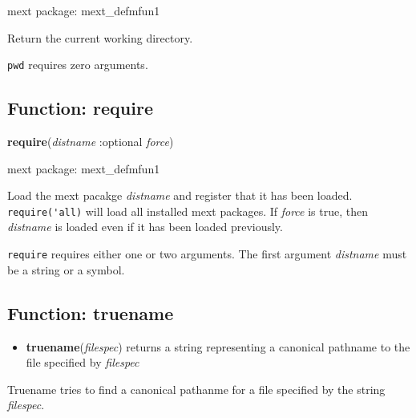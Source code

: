\documentclass[]{article}
\begin{document}
\noindent mext package: mext\_defmfun1



\vspace{5 pt}
Return the current working directory. 

\vspace{5 pt}

   {\tt pwd} requires zero arguments.


\vspace{5 pt}


\subsection{Function: require\label{sec:require}}
\hypertarget{require}{}
{\bf require}({\it distname} :optional {\it force})


\noindent mext package: mext\_defmfun1



\vspace{5 pt}
Load the mext pacakge {\it distname} and register that it has been loaded. \verb#require('all)# will load all installed mext packages. If {\it force} is true, then {\it distname} is loaded even if it has been loaded previously. 

\vspace{5 pt}

   {\tt require} requires either one or two arguments.
    The first argument {\it distname} must be a string or a symbol.


\vspace{5 pt}


\subsection{Function: truename\label{sec:truename}}
\hypertarget{truename}{}



\vspace{5 pt}
\begin{itemize}
\item[] {\bf truename}({\it filespec})
  returns a string representing a canonical pathname to the file specified by {\it filespec} 

\end{itemize}
Truename tries to find a canonical pathanme for a file specified by the string {\it filespec}. 
\end{document}
